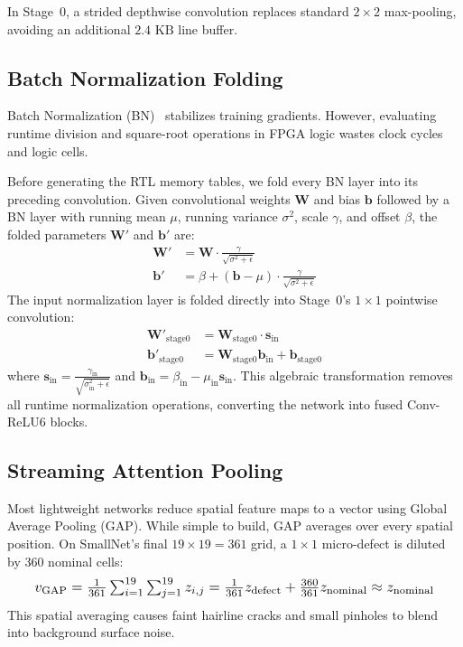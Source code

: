 \documentclass[conference]{IEEEtran}
\begin{document}
In Stage~0, a strided depthwise convolution replaces standard $2\times2$ max-pooling, avoiding an additional $2.4\text{ KB}$ line buffer.

\subsection{Batch Normalization Folding}
Batch Normalization (BN)~\cite{ioffe2015batch} stabilizes training gradients. However, evaluating runtime division and square-root operations in FPGA logic wastes clock cycles and logic cells.

Before generating the RTL memory tables, we fold every BN layer into its preceding convolution. Given convolutional weights $\mathbf{W}$ and bias $\mathbf{b}$ followed by a BN layer with running mean $\mu$, running variance $\sigma^2$, scale $\gamma$, and offset $\beta$, the folded parameters $\mathbf{W}'$ and $\mathbf{b}'$ are:
\begin{align}
\mathbf{W}' &= \mathbf{W} \cdot \frac{\gamma}{\sqrt{\sigma^2 + \epsilon}} \\
\mathbf{b}' &= \beta + (\mathbf{b} - \mu) \cdot \frac{\gamma}{\sqrt{\sigma^2 + \epsilon}}
\end{align}
The input normalization layer is folded directly into Stage~0's $1\times1$ pointwise convolution:
\begin{align}
\mathbf{W}'_{\text{stage0}} &= \mathbf{W}_{\text{stage0}} \cdot \mathbf{s}_{\text{in}} \\
\mathbf{b}'_{\text{stage0}} &= \mathbf{W}_{\text{stage0}} \mathbf{b}_{\text{in}} + \mathbf{b}_{\text{stage0}}
\end{align}
where $\mathbf{s}_{\text{in}} = \frac{\gamma_{\text{in}}}{\sqrt{\sigma_{\text{in}}^2 + \epsilon}}$ and $\mathbf{b}_{\text{in}} = \beta_{\text{in}} - \mu_{\text{in}} \mathbf{s}_{\text{in}}$. This algebraic transformation removes all runtime normalization operations, converting the network into fused Conv-ReLU6 blocks.

\subsection{Streaming Attention Pooling}
Most lightweight networks reduce spatial feature maps to a vector using Global Average Pooling (GAP). While simple to build, GAP averages over every spatial position. On SmallNet's final $19\times19 = 361$ grid, a $1\times1$ micro-defect is diluted by 360 nominal cells:
\begin{equation}
\resizebox{0.92\columnwidth}{!}{$
v_{\text{GAP}} = \frac{1}{361} \sum_{i=1}^{19} \sum_{j=1}^{19} z_{i,j} = \frac{1}{361} z_{\text{defect}} + \frac{360}{361} z_{\text{nominal}} \approx z_{\text{nominal}}
$}
\end{equation}
This spatial averaging causes faint hairline cracks and small pinholes to blend into background surface noise.
\end{document}
